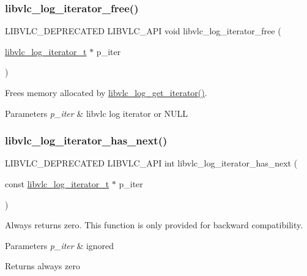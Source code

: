 \subsubsection{\texorpdfstring{libvlc\+\_\+log\+\_\+iterator\+\_\+free()}{libvlc\_log\_iterator\_free()}}
{\footnotesize\ttfamily L\+I\+B\+V\+L\+C\+\_\+\+D\+E\+P\+R\+E\+C\+A\+T\+ED L\+I\+B\+V\+L\+C\+\_\+\+A\+PI void libvlc\+\_\+log\+\_\+iterator\+\_\+free (\begin{DoxyParamCaption}\item[{\hyperlink{group__libvlc__log_ga5bc36e29d8021e6a8d06223ea2ce2262}{libvlc\+\_\+log\+\_\+iterator\+\_\+t} $\ast$}]{p\+\_\+iter }\end{DoxyParamCaption})}

Frees memory allocated by \hyperlink{group__libvlc__log_gadd31c491e4085daa56015f07cfbc5005}{libvlc\+\_\+log\+\_\+get\+\_\+iterator()}.


\begin{DoxyParams}{Parameters}
{\em p\+\_\+iter} & libvlc log iterator or N\+U\+LL \\
\hline
\end{DoxyParams}
\mbox{\label{group__libvlc__log_ga2bd68048a0d546807e8c91ba78c83e50}} 
\subsubsection{\texorpdfstring{libvlc\+\_\+log\+\_\+iterator\+\_\+has\+\_\+next()}{libvlc\_log\_iterator\_has\_next()}}
{\footnotesize\ttfamily L\+I\+B\+V\+L\+C\+\_\+\+D\+E\+P\+R\+E\+C\+A\+T\+ED L\+I\+B\+V\+L\+C\+\_\+\+A\+PI int libvlc\+\_\+log\+\_\+iterator\+\_\+has\+\_\+next (\begin{DoxyParamCaption}\item[{const \hyperlink{group__libvlc__log_ga5bc36e29d8021e6a8d06223ea2ce2262}{libvlc\+\_\+log\+\_\+iterator\+\_\+t} $\ast$}]{p\+\_\+iter }\end{DoxyParamCaption})}

Always returns zero. This function is only provided for backward compatibility.


\begin{DoxyParams}{Parameters}
{\em p\+\_\+iter} & ignored \\
\hline
\end{DoxyParams}
\begin{DoxyReturn}{Returns}
always zero 
\end{DoxyReturn}
\mbox{\label{group__libvlc__log_ga144d0134b80f6e09e977ab051289a59d}} 
